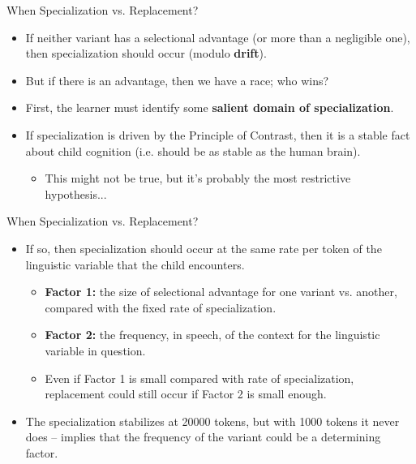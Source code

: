 \documentclass[hyperref={pdfpagelabels=false}]{beamer}
\begin{document}
\begin{frame}{When Specialization vs. Replacement?}
\begin{itemize}
	\item If neither variant has a selectional advantage (or more than a negligible one), then specialization should occur (modulo \textbf{drift}).
	\item But if there is an advantage, then we have a race; who wins?
	\item First, the learner must identify some \textbf{salient domain of specialization}.
	\item If specialization is driven by the Principle of Contrast, then it is a stable fact about child cognition (i.e. should be as stable as the human brain).
	\begin{itemize}
		\item This might not be true, but it's probably the most restrictive hypothesis...
	\end{itemize}
\end{itemize}
\end{frame}

\begin{frame}{When Specialization vs. Replacement?}
\begin{itemize}
	\item If so, then specialization should occur at the same rate per token of the linguistic variable that the child encounters.
	\begin{itemize}
		\item \textbf{Factor 1:} the size of selectional advantage for one variant vs. another, compared with the fixed rate of specialization.
		\item \textbf{Factor 2:} the frequency, in speech, of the context for the linguistic variable in question.
		\item Even if Factor 1 is small compared with rate of specialization, replacement could still occur if Factor 2 is small enough.
	\end{itemize}
	\item The specialization stabilizes at 20000 tokens, but with 1000 tokens it never does -- implies that the frequency of the variant could be a determining factor.
\end{itemize}
\end{frame}



\end{document}
